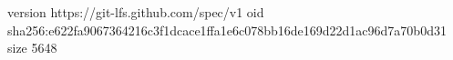 version https://git-lfs.github.com/spec/v1
oid sha256:e622fa9067364216c3f1dcace1ffa1e6c078bb16de169d22d1ac96d7a70b0d31
size 5648
